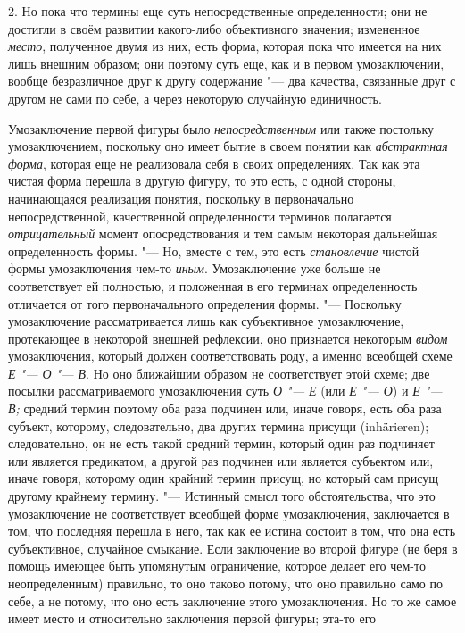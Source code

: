 2. Но пока что термины еще суть непосредственные
определенности; они не достигли в своём развитии какого-либо объективного
значения; измененное {\em место},
полученное двумя из них, есть форма, которая пока что имеется
на них лишь внешним образом; они поэтому суть еще, как и в
первом умозаключении, вообще безразличное друг к другу содержание
"--- два качества, связанные друг с другом не сами по себе, а
через некоторую случайную единичность.

Умозаключение первой фигуры было {\em непосредственным}
или также постольку умозаключением, поскольку оно имеет бытие
в своем понятии как {\em абстрактная
форма}, которая еще не реализовала себя в своих
определениях. Так как эта чистая форма перешла в другую фигуру, то это
есть, с одной стороны, начинающаяся реализация понятия, поскольку в
первоначально непосредственной, качественной определенности терминов
полагается {\em отрицательный}
момент опосредствования и тем самым некоторая дальнейшая
определенность формы. "--- Но, вместе с тем, это есть
{\em становление} чистой формы умозаключения чем-то {\em иным}.
Умозаключение уже больше не соответствует ей полностью, и
положенная в его терминах определенность отличается от того первоначального
определения формы. "--- Поскольку умозаключение рассматривается
лишь как субъективное умозаключение, протекающее в некоторой внешней
рефлексии, оно признается некоторым {\em видом}
умозаключения, который должен соответствовать роду, а именно
всеобщей схеме {\em Е "--- О "--- В}. Но оно ближайшим
образом не соответствует этой схеме; две посылки рассматриваемого
умозаключения суть {\em О "--- Е} (или {\em Е "--- О}) и
{\em Е "--- В;} средний термин поэтому оба раза подчинен
или, иначе говоря, есть оба раза субъект, которому, следовательно, два
других термина присущи (inhärieren); следовательно, он не
есть такой средний термин, который один раз подчиняет или является
предикатом, а другой раз подчинен или является субъектом или, иначе говоря,
которому один крайний термин присущ, но который сам присущ другому крайнему
термину. "--- Истинный смысл того обстоятельства, что это
умозаключение не соответствует всеобщей форме умозаключения, заключается в
том, что последняя перешла в него, так как ее истина состоит в том, что она
есть субъективное, случайное смыкание. Если заключение во второй фигуре (не
беря в помощь имеющее быть упомянутым ограничение, которое делает его
чем-то неопределенным) правильно, то оно таково потому, что оно правильно
само по себе, а не потому, что оно есть заключение этого умозаключения. Но
то же самое имеет место и относительно заключения первой фигуры; эта-то его
